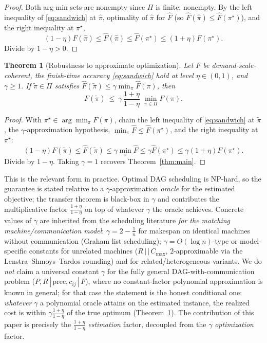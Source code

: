\documentclass{amsart}
\newtheorem{theorem}{Theorem}
\theoremstyle{definition}
\begin{document}
\begin{proof}
Both arg-min sets are nonempty since $\Pi$ is finite, nonempty. By the left
inequality of \eqref{eq:sandwich} at $\hat\pi$, optimality of $\hat\pi$ for
$\widehat F$ (so $\widehat F(\hat\pi)\le\widehat F(\pi^\star)$), and the right
inequality at $\pi^\star$,
\[
(1-\eta)F(\hat\pi)\le\widehat F(\hat\pi)\le\widehat F(\pi^\star)
\le(1+\eta)F(\pi^\star).
\]
Divide by $1-\eta>0$.
\end{proof}

\begin{theorem}[Robustness to approximate optimization]\label{thm:approxalg}
Let $F$ be demand-scale-coherent, the finish-time accuracy \eqref{eq:sandwich}
hold at level $\eta\in(0,1)$, and $\gamma\ge1$. If $\tilde\pi\in\Pi$ satisfies
$\widehat F(\tilde\pi)\le\gamma\min_{\pi}\widehat F(\pi)$, then
\begin{equation}\label{eq:approxalg}
F(\tilde\pi)\ \le\ \gamma\,\frac{1+\eta}{1-\eta}\;\min_{\pi\in\Pi}F(\pi).
\end{equation}
\end{theorem}

\begin{proof}
With $\pi^\star\in\arg\min_\pi F(\pi)$, chain the left inequality of
\eqref{eq:sandwich} at $\tilde\pi$, the $\gamma$-approximation hypothesis,
$\min_\pi\widehat F\le\widehat F(\pi^\star)$, and the right inequality at
$\pi^\star$:
\[
(1-\eta)F(\tilde\pi)\le\widehat F(\tilde\pi)\le\gamma\min_\pi\widehat F
\le\gamma\widehat F(\pi^\star)\le\gamma(1+\eta)F(\pi^\star).
\]
Divide by $1-\eta$. Taking $\gamma=1$ recovers Theorem~\ref{thm:main}.
\end{proof}

This is the relevant form in practice. Optimal DAG scheduling is NP-hard, so the
guarantee is stated relative to a $\gamma$-approximation \emph{oracle} for the
estimated objective; the transfer theorem is black-box in $\gamma$ and contributes
the multiplicative factor $\frac{1+\eta}{1-\eta}$ on top of whatever $\gamma$ the
oracle achieves. Concrete values of $\gamma$ are inherited from the scheduling
literature \emph{for the matching machine/communication model}: $\gamma=2-\tfrac1n$
for makespan on identical machines without communication (Graham list scheduling);
$\gamma=O(\log n)$-type or model-specific constants for unrelated machines
($R\,|\,|\,C_{\max}$, $2$-approximable via the Lenstra--Shmoys--Tardos rounding)
and for related/heterogeneous variants. We do \emph{not} claim a universal
constant $\gamma$ for the fully general DAG-with-communication problem
($P,R\,|\,\mathrm{prec},c_{ij}\,|\,F$), where no constant-factor polynomial
approximation is known in general; for that case the statement is the honest
conditional one: \emph{whatever} $\gamma$ a polynomial oracle attains on the
estimated instance, the realized cost is within $\gamma\frac{1+\eta}{1-\eta}$ of
the true optimum (Theorem~\ref{thm:approxalg}). The contribution of this paper is
precisely the $\frac{1+\eta}{1-\eta}$ \emph{estimation} factor, decoupled from
the $\gamma$ \emph{optimization} factor.
\end{document}
